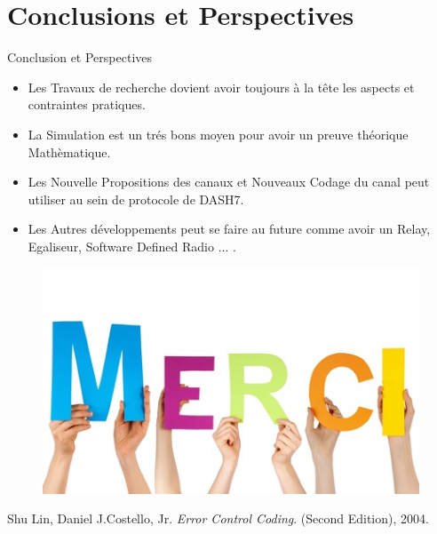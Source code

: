 \documentclass[8pt]{beamer}
\newcommand{\1}{\mathbbm 1}
\begin{document}
%
%
%
  
  




\section{Conclusions et Perspectives}

\begin{frame}{Conclusion et Perspectives}
\begin{itemize}
 
\item Les Travaux de recherche dovient avoir toujours à la tête les aspects et contraintes pratiques.  
\item La Simulation est un trés bons moyen pour avoir un preuve théorique Mathèmatique.
\item Les Nouvelle Propositions des canaux et Nouveaux Codage du canal peut utiliser au sein de protocole de DASH7.
\item Les Autres développements peut se faire au future comme avoir un Relay, Egaliseur, Software Defined Radio ... .
\end{itemize}

\end{frame}


\begin{frame}



\begin{figure}[h!]
  \centering
    \includegraphics[scale=0.5]{figures/merci.jpg}
\end{figure}



\end{frame}




\begin{thebibliography}{9}

Shu Lin, Daniel J.Costello, Jr. 
\textit{Error Control Coding}. (Second Edition), 2004.

\end{thebibliography}
\end{document}

